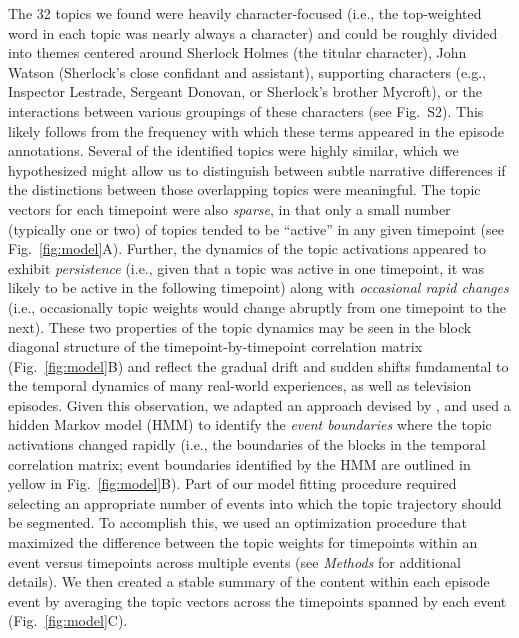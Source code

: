 \documentclass[10pt]{article}
\newcommand{\topics}{S2}
\begin{document}
The 32 topics we found were heavily character-focused (i.e., the top-weighted word in each topic was nearly always a character) and could be roughly divided into themes centered around Sherlock Holmes (the titular character), John Watson (Sherlock's close confidant and assistant), supporting characters (e.g., Inspector Lestrade, Sergeant Donovan, or Sherlock's brother Mycroft), or the interactions between various groupings of these characters (see Fig.~\topics).  This likely follows from the frequency with which these terms appeared in the episode annotations.  Several of the identified topics were highly similar, which we hypothesized might allow us to distinguish between subtle narrative differences if the distinctions between those overlapping topics were meaningful.  The topic vectors for each timepoint were also \textit{sparse}, in that only a small number (typically one or two) of topics tended to be ``active'' in any given timepoint (see Fig.~\ref{fig:model}A).  Further, the dynamics of the topic activations appeared to exhibit \textit{persistence} (i.e., given that a topic was active in one timepoint, it was likely to be active in the following timepoint) along with \textit{occasional rapid changes} (i.e., occasionally topic weights would change abruptly from one timepoint to the next).  These two properties of the topic dynamics may be seen in the block diagonal structure of the timepoint-by-timepoint correlation matrix (Fig.~\ref{fig:model}B) and reflect the gradual drift and sudden shifts fundamental to the temporal dynamics of many real-world experiences, as well as television episodes.  Given this observation, we adapted an approach devised by \cite{BaldEtal17}, and used a hidden Markov model (HMM) to identify the \textit{event boundaries} where the topic activations changed rapidly (i.e., the boundaries of the blocks in the temporal correlation matrix; event boundaries identified by the HMM are outlined in yellow in Fig.~\ref{fig:model}B).  Part of our model fitting procedure required selecting an appropriate number of events into which the topic trajectory should be segmented.  To accomplish this, we used an optimization procedure that maximized the difference between the topic weights for timepoints within an event versus timepoints across multiple events (see \textit{Methods} for additional details).  We then created a stable summary of the content within each episode event by averaging the topic vectors across the timepoints spanned by each event (Fig.~\ref{fig:model}C).
\end{document}
